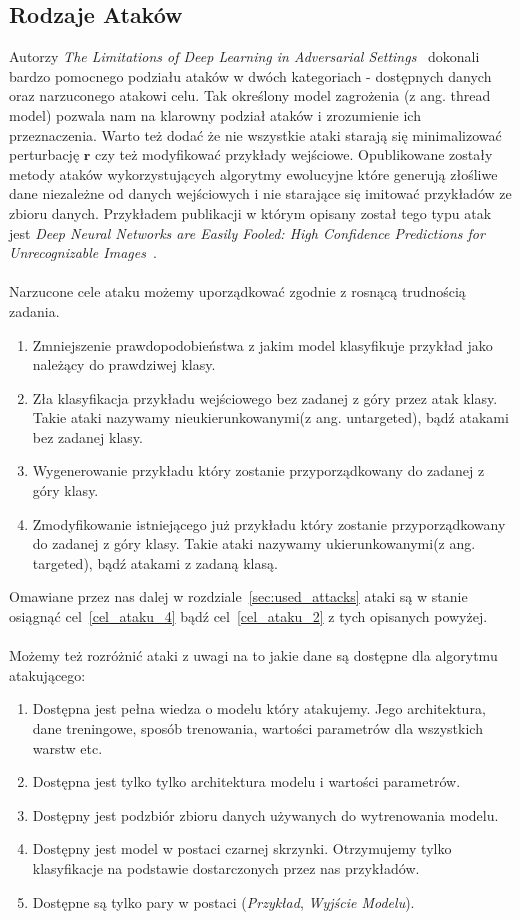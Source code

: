 \documentclass[
    left=2.5cm,         %
    right=2.5cm,        %
    top=2.5cm,          %
    bottom=3cm,         %
    bindingoffset=6mm,  %
    nohyphenation=false %
]{eiti/eiti-thesis}
\renewcommand{\vec}[1]{\mathbf{#1}}
\begin{document}
\subsection{Rodzaje Ataków}\label{attack-kinds}
Autorzy \textit{The Limitations of Deep Learning in Adversarial Settings}~\cite{DBLP:journals/corr/PapernotMJFCS15}
dokonali bardzo pomocnego podziału ataków w dwóch kategoriach - dostępnych danych oraz narzuconego atakowi celu. Tak określony
model zagrożenia (z ang. thread model) pozwala nam na klarowny podział ataków i zrozumienie ich przeznaczenia. Warto też dodać
że nie wszystkie ataki starają się minimalizować perturbację $\vec{r}$ czy też modyfikować przykłady wejściowe. Opublikowane zostały
metody ataków wykorzystujących algorytmy ewolucyjne które generują złośliwe dane niezależne od danych wejściowych i nie starające się
imitować przykładów ze zbioru danych. Przykładem publikacji w którym opisany został tego typu atak jest \textit{Deep Neural Networks are Easily Fooled: High Confidence Predictions for Unrecognizable Images}~\cite{DBLP:journals/corr/NguyenYC14}.
\\~\\
Narzucone cele ataku możemy uporządkować zgodnie z rosnącą trudnością zadania.
\begin{enumerate}
    \item Zmniejszenie prawdopodobieństwa z jakim model klasyfikuje przykład jako należący do prawdziwej klasy.
    \item \label{cel_ataku_2} Zła klasyfikacja przykładu wejściowego bez zadanej z góry przez atak klasy. Takie ataki nazywamy nieukierunkowanymi(z ang. untargeted), bądź atakami bez zadanej klasy.
    \item Wygenerowanie przykładu który zostanie przyporządkowany do zadanej z góry klasy.
    \item \label{cel_ataku_4} Zmodyfikowanie istniejącego już przykładu który zostanie przyporządkowany do zadanej z góry klasy. Takie ataki nazywamy ukierunkowanymi(z ang. targeted), bądź atakami z zadaną klasą.
\end{enumerate}
Omawiane przez nas dalej w rozdziale~\ref{sec:used_attacks} ataki są w stanie osiągnąć cel~\ref{cel_ataku_4} bądź cel~\ref{cel_ataku_2} z tych opisanych powyżej.
\\~\\
Możemy też rozróżnić ataki z uwagi na to jakie dane są dostępne dla algorytmu atakującego:
\begin{enumerate}
    \item \label{atak_1} Dostępna jest pełna wiedza o modelu który atakujemy. Jego architektura, dane treningowe, sposób trenowania, wartości parametrów dla wszystkich warstw etc.
    \item \label{atak_2} Dostępna jest tylko tylko architektura modelu i wartości parametrów.
    \item Dostępny jest podzbiór zbioru danych używanych do wytrenowania modelu.
    \item Dostępny jest model w postaci czarnej skrzynki. Otrzymujemy tylko klasyfikacje na podstawie dostarczonych przez nas przykładów.
    \item Dostępne są tylko pary w postaci (\textit{Przykład}, \textit{Wyjście Modelu}).
\end{enumerate}
\end{document}
